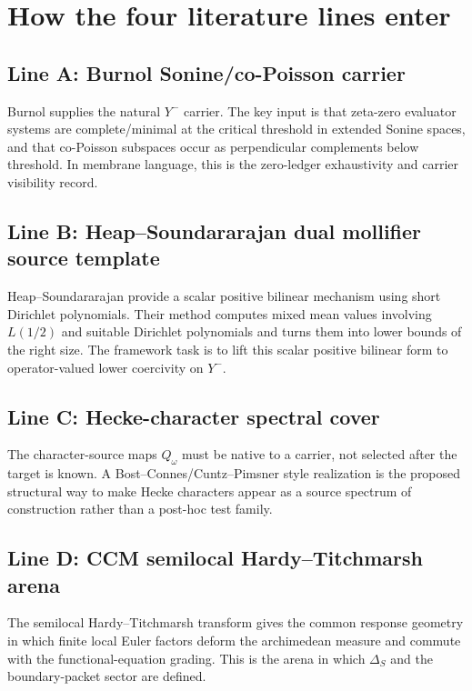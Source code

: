 \documentclass[11pt]{article}
\begin{document}
\section{How the four literature lines enter}

\subsection{Line A: Burnol Sonine/co-Poisson carrier}
Burnol supplies the natural $Y^-$ carrier.  The key input is that zeta-zero evaluator systems are complete/minimal at the critical threshold in extended Sonine spaces, and that co-Poisson subspaces occur as perpendicular complements below threshold.  In membrane language, this is the zero-ledger exhaustivity and carrier visibility record.

\subsection{Line B: Heap--Soundararajan dual mollifier source template}
Heap--Soundararajan provide a scalar positive bilinear mechanism using short Dirichlet polynomials.  Their method computes mixed mean values involving $L(1/2)$ and suitable Dirichlet polynomials and turns them into lower bounds of the right size.  The framework task is to lift this scalar positive bilinear form to operator-valued lower coercivity on $Y^-$.

\subsection{Line C: Hecke-character spectral cover}
The character-source maps $Q_\omega$ must be native to a carrier, not selected after the target is known.  A Bost--Connes/Cuntz--Pimsner style realization is the proposed structural way to make Hecke characters appear as a source spectrum of construction rather than a post-hoc test family.

\subsection{Line D: CCM semilocal Hardy--Titchmarsh arena}
The semilocal Hardy--Titchmarsh transform gives the common response geometry in which finite local Euler factors deform the archimedean measure and commute with the functional-equation grading.  This is the arena in which $\Delta_S$ and the boundary-packet sector are defined.
\end{document}
